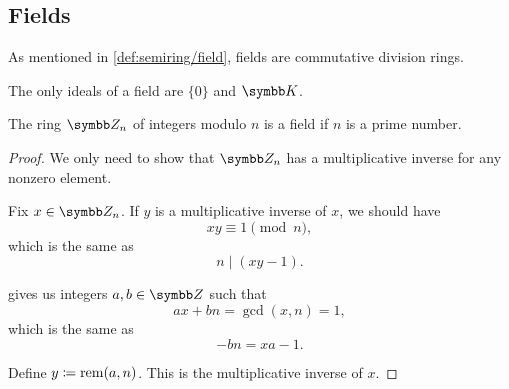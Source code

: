 \subsection{Fields}\label{subsec:fields}

\begin{definition}\label{def:field}
  As mentioned in \cref{def:semiring/field}, fields are commutative division rings.
\end{definition}

\begin{proposition}\label{thm:ideals_of_field}
  The only ideals of a field are \( \{ 0 \} \) and \( \BK \).
\end{proposition}

\begin{theorem}\label{thm:ring_of_integers_module_prime_is_field}
  The ring \( \BZ_n \) of integers modulo \( n \) is a field if \( n \) is a prime number.
\end{theorem}
\begin{proof}
  We only need to show that \( \BZ_n \) has a multiplicative inverse for any nonzero element.

  Fix \( x \in \BZ_n \). If \( y \) is a multiplicative inverse of \( x \), we should have
  \begin{equation*}
    xy \equiv 1 \pmod n,
  \end{equation*}
  which is the same as
  \begin{equation*}
    n \mid (xy - 1).
  \end{equation*}

   gives us integers \( a, b \in \BZ \) such that
  \begin{equation*}
    ax + bn = \gcd(x, n) = 1,
  \end{equation*}
  which is the same as
  \begin{equation*}
    -bn = xa - 1.
  \end{equation*}

  Define \( y \coloneqq \operatorname{rem}(a, n) \). This is the multiplicative inverse of \( x \).
\end{proof}

